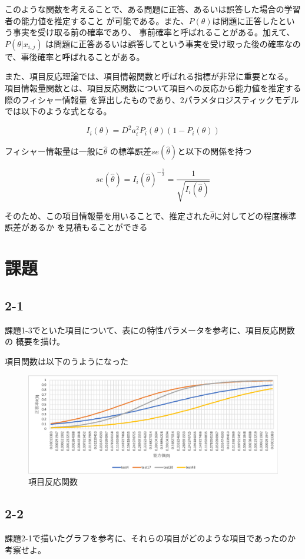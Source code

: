 \documentclass{jsarticle}
\begin{document}
このような関数を考えることで、ある問題に正答、あるいは誤答した場合の学習者の能力値を推定すること
が可能である。また、$P(\theta)$は問題に正答したという事実を受け取る前の確率であり、
事前確率と呼ばれることがある。加えて、$P(\theta | x_{i,j})$
は問題に正答あるいは誤答してという事実を受け取った後の確率なので、事後確率と呼ばれることがある。

また、項目反応理論では、項目情報関数と呼ばれる指標が非常に重要となる。
項目情報量関数とは、項目反応関数について項目への反応から能力値を推定する際のフィシャー情報量
を算出したものであり、2パラメタロジスティックモデルでは以下のような式となる。

$$
  I_i(\theta) = D^2a^2_iP_i(\theta)(1 - P_i(\theta))
$$

フィシャー情報量は一般に$\hat{\theta}$ の標準誤差$se(\hat{\theta})$と以下の関係を持つ

$$
  se(\hat{\theta}) = I_i(\hat{\theta})^{-\frac{1}{2}} = \frac{1}{\sqrt{I_i(\hat{\theta})}}
$$

そのため、この項目情報量を用いることで、推定された$\hat{\theta}$に対してどの程度標準誤差があるか
を見積もることができる

\section{課題}
\subsection{2-1}
課題1-3でといた項目について、表にの特性パラメータを参考に、項目反応関数の
概要を描け。

項目関数は以下のうようになった

\begin{figure}[H]
  \centering
  \includegraphics[width=12cm]{./key1.png}
  \caption{項目反応関数}
\end{figure}

\subsection{2-2}
課題2-1で描いたグラフを参考に、それらの項目がどのような項目であったのか
考察せよ。
\end{document}
